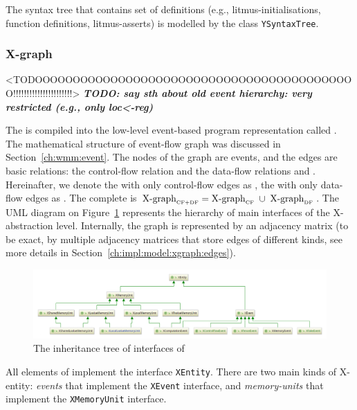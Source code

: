 The syntax tree that contains set of definitions (e.g., litmus-initialisations, function definitions, litmus-asserts) is modelled by the class \texttt{YSyntaxTree}.


\subsubsection{X-graph}
\label{ch:impl:model:xgraph}

<TODOOOOOOOOOOOOOOOOOOOOOOOOOOOOOOOOOOOOOOOOOOO!!!!!!!!!!!!!!!!!!!!!!>
\textit{\textbf{TODO: say sth about old event hierarchy: very restricted (e.g., only loc<-reg)}}

The \ytree{} is compiled into the low-level event-based program representation called \textit{\xgraph{}}.
The mathematical structure of event-flow graph was discussed in Section~\ref{ch:wmm:event}.
The nodes of the graph are events, and the edges are basic relations: the control-flow relation \po{} and the data-flow relations \co{} and \rf{}.
Hereinafter, we denote the \xgraph{} with only control-flow edges as \xgraph[CF], the \xgraph{} with only data-flow edges as \xgraph[CF].
The complete \xgraph{} is $\xgraph[CF+DF] = \xgraph[CF] \; \cup \; \xgraph[DF]$.
The UML diagram on Figure~\ref{fig:class-diagrams:XEntity-interfaces} represents the hierarchy of main interfaces of the X-abstraction level.
Internally, the graph is represented by an adjacency matrix (to be exact, by multiple adjacency matrices that store edges of different kinds, see more details in Section~\ref{ch:impl:model:xgraph:edges}).

\begin{figure}[t]%
  \centering
  \includegraphics[width=\textwidth,keepaspectratio]{img/my/class-diagrams/XEntity-interfaces.png}
  \caption{The inheritance tree of interfaces of \xgraph{}}
  \label{fig:class-diagrams:XEntity-interfaces}
\end{figure}

All elements of \xgraph{} implement the interface \texttt{XEntity}.
There are two main kinds of X-entity: \textit{events} that implement the \texttt{XEvent} interface, and \textit{memory-units} that implement the \texttt{XMemoryUnit} interface.

